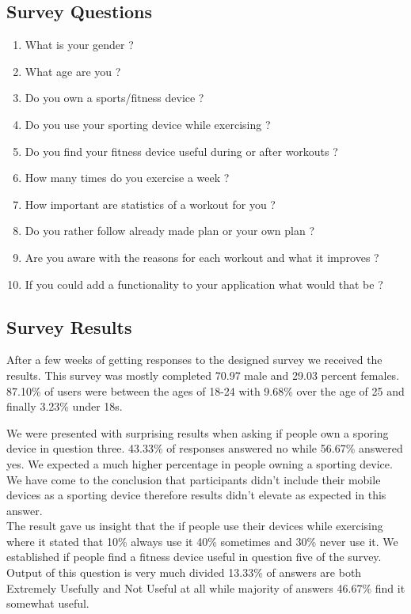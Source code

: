 \documentclass[a4paper,12pt]{report}
\begin{document}
\subsection{Survey Questions}

\begin{enumerate}
    \item What is your gender ?
    \item What age are you ? 
    \item Do you own a sports/fitness device ?
    \item Do you use your sporting device while exercising ?
    \item Do you find your fitness device useful during or after workouts ?
    \item How many times do you exercise a week ?
    \item How important are statistics of a workout for you ?
    \item Do you rather follow already made plan or your own plan ?
    \item Are you aware with the reasons for each workout and what it improves ?
    \item If you could add a functionality to your application what would that be ?
\end{enumerate}

\subsection{Survey Results}

After a few weeks of getting responses to the designed survey we received the results.
This survey was mostly completed 70.97 male and 29.03 percent females.
87.10\% of users were between the ages of 18-24 with 9.68\% over the age of 25 and finally 3.23\% under 18s.

We were presented with surprising results when asking if people own a sporing device in question three.
43.33\% of responses answered no while 56.67\% answered yes. We expected a much higher percentage in people owning a sporting device. We have come to the conclusion that participants didn't include their mobile devices as a sporting device therefore results didn't elevate as expected in this answer.\\ 

The result gave us insight that the if people use their devices while exercising where it stated that 10\% always use it 40\% sometimes and 30\% never use it.
We established if people find a fitness device useful in question five of the survey. Output of this question is very much divided 13.33\% of answers are both Extremely Usefully and Not Useful at all while majority of answers 46.67\% find it somewhat useful.
\end{document}
